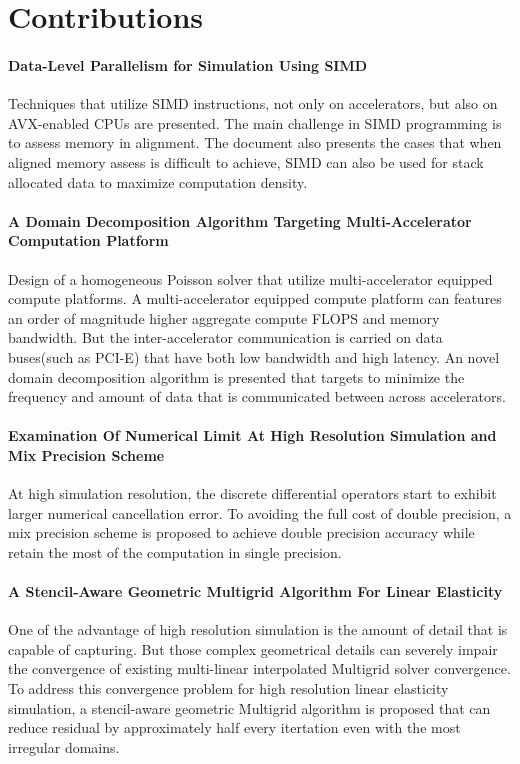 \section{Contributions}

\paragraph{Data-Level Parallelism for Simulation Using SIMD}  Techniques that utilize SIMD instructions, not only on accelerators, but also on AVX-enabled CPUs are presented. The main challenge in SIMD programming is to assess memory in alignment. The document also presents the cases that when aligned memory assess is difficult to achieve, SIMD can also be used for stack allocated data to maximize computation density.

\paragraph{A Domain Decomposition Algorithm Targeting Multi-Accelerator Computation Platform} Design of a homogeneous Poisson solver that utilize multi-accelerator equipped compute platforms. A multi-accelerator equipped compute platform can features an order of magnitude higher aggregate compute FLOPS and memory bandwidth. But the inter-accelerator communication is carried on data buses(such as PCI-E) that have both low bandwidth and high latency. An novel domain decomposition algorithm is presented that targets to minimize the frequency and amount of data that is communicated between across accelerators.

\paragraph{Examination Of Numerical Limit At High Resolution Simulation and Mix Precision Scheme} At high simulation resolution, the discrete differential operators start to exhibit larger numerical cancellation error. To avoiding the full cost of double precision, a mix precision scheme is proposed to achieve double precision accuracy while retain the most of the computation in single precision.

\paragraph{A Stencil-Aware Geometric Multigrid Algorithm For Linear Elasticity} One of the advantage of high resolution simulation is the amount of detail that is capable of capturing. But those complex geometrical details can severely impair the convergence of existing multi-linear interpolated Multigrid solver convergence. To address this convergence problem for high resolution linear elasticity simulation, a stencil-aware geometric Multigrid algorithm is proposed that can reduce residual by approximately half every itertation even with the most irregular domains.

